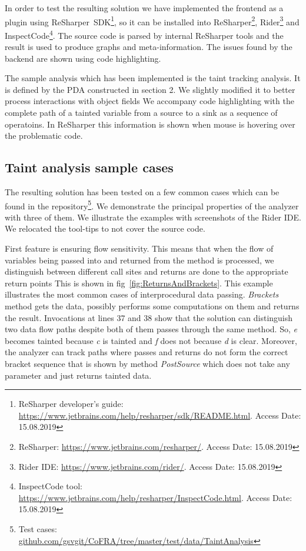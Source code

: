 In order to test the resulting solution we have implemented the frontend as a plugin using ReSharper~SDK\footnote{ReSharper developer's guide: \url{https://www.jetbrains.com/help/resharper/sdk/README.html}. Access Date: 15.08.2019}, so it can be installed into ReSharper\footnote{ReSharper: \url{https://www.jetbrains.com/resharper/}. Access Date: 15.08.2019}, Rider\footnote{Rider IDE: \url{https://www.jetbrains.com/rider/}. Access Date: 15.08.2019} and InspectCode\footnote{InspectCode tool: \url{https://www.jetbrains.com/help/resharper/InspectCode.html}. Access Date: 15.08.2019}.
The source code is parsed by internal ReSharper tools and the result is used to produce graphs and meta-information.
The issues found by the backend are shown using code highlighting.

The sample analysis which has been implemented is the taint tracking analysis.
It is defined by the PDA constructed in section 2.
We slightly modified it to better process interactions with object fields
We accompany code highlighting with the complete path of a tainted variable from a source to a sink as a sequence of operatoins.
In ReSharper this information is shown when mouse is hovering over the problematic code.

\subsection{Taint analysis sample cases}

The resulting solution has been tested on a few common cases which can be found in the repository\footnote{Test cases: \url{github.com/gsvgit/CoFRA/tree/master/test/data/TaintAnalysis}}.
We demonstrate the principal properties of the analyzer with three of them.
We illustrate the examples with screenshots of the Rider IDE.
We relocated the tool-tips to not cover the source code.

First feature is ensuring flow sensitivity.
This means that when the flow of variables being passed into and returned from the method is processed, we distinguish between different call sites and returns are done to the appropriate return points
This is shown in fig~\ref{fig:ReturnsAndBrackets}.
This example illustrates the most common cases of interprocedural data passing.
\textit{Brackets} method gets the data, possibly performs some computations on them and returns the result.
Invocations at lines 37 and 38 show that the solution can distinguish two data flow paths despite both of them passes through the same method.
So, \textit{e} becomes tainted because \textit{c} is tainted and \textit{f} does not because \textit{d} is clear.
Moreover, the analyzer can track paths where passes and returns do not form the correct bracket sequence that is shown by method \textit{PostSource} which does not take any parameter and just returns tainted data.

